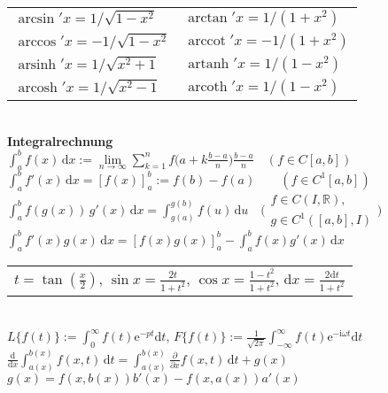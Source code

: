 \documentclass[a4paper,10pt,fleqn,twoside,twocolumn,dvipdfmx]{scrartcl}
\newcommand{\ee}{\mathrm e}
\newcommand{\ui}{\mathrm i}
\newcommand{\R}{\mathbb R}
\newcommand{\strong}[1]{\textsf{\textbf{#1}}}
\newcommand{\ds}{\displaystyle}
\newcommand{\arccot}{\operatorname{arccot}}
\newcommand{\arsinh}{\operatorname{arsinh}}
\newcommand{\arcosh}{\operatorname{arcosh}}
\newcommand{\artanh}{\operatorname{artanh}}
\newcommand{\arcoth}{\operatorname{arcoth}}
\begin{document}
\begin{tabular}{@{}l|l}
$\arcsin'x = 1/\sqrt{1-x^2}$ & $\arctan'x = 1/(1+x^2)$\\
$\arccos'x = -1/\sqrt{1-x^2}$ & $\arccot'x = -1/(1+x^2)$\\ 
$\arsinh'x = 1/\sqrt{x^2+1}$ & $\artanh'x = 1/(1-x^2)$\\
$\arcosh'x = 1/\sqrt{x^2-1}$ & $\arcoth'x = 1/(1-x^2)$
\end{tabular}\\[4pt]
\strong{Integralrechnung}\\
$\int_a^b f(x)\,\mathrm dx
:= \lim\limits_{n\to\infty}\sum_{k=1}^n
f\!\big(a+k\frac{b-a}{n}\big)\frac{b-a}{n}\quad (f\in C[a,b])$\\
$\int_a^b f'(x)\,\mathrm dx = [f(x)]_a^b := f(b)-f(a)\qquad (f\in C^1[a,b])$\\
$\int_a^b f(g(x))\,g'(x)\,\mathrm dx = \int_{g(a)}^{g(b)} f(u)\,\mathrm du\quad
\Big(\begin{smallmatrix}f\in C(I,\R),\\ g\in C^1([a,b],I)\end{smallmatrix}\Big)$\\
$\int_a^b\! f'(x)g(x)\,\mathrm dx = [f(x)g(x)]_a^b-\int_a^b\! f(x)g'(x)\,\mathrm dx$%
\;\\
\begin{tabular}{@{}l}
$t=\tan(\frac{x}{2})$,\; $\sin x = \frac{2t}{1+t^2}$,\;
$\cos x = \frac{1-t^2}{1+t^2}$,\; $\mathrm dx = \frac{2\mathrm dt}{1+t^2}$
\end{tabular}\\
$L\{f(t)\} := \int_0^{\infty}\! f(t)\ee^{-pt}\mathrm dt$,\;
$F\{f(t)\} := \frac{1}{\sqrt{2\pi}}\int_{-\infty}^{\infty}
f(t)\ee^{-\ui\omega t}\mathrm dt$\\
$\ds\frac{\mathrm d}{\mathrm dx}\int_{a(x)}^{b(x)} f(x,t)\,\mathrm dt
= \int_{a(x)}^{b(x)} \frac{\partial}{\partial x}f(x,t)\,\mathrm dt+g(x)$\\
$g(x) = f(x,b(x))b'(x) - f(x,a(x))a'(x)$
\end{document}

